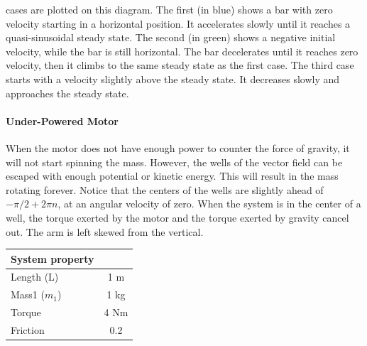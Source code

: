 \documentclass{article}
\begin{document}
 cases are plotted on this diagram. The first (in blue) shows a bar with zero velocity starting in a horizontal position. It accelerates slowly until it reaches a quasi-sinusoidal steady state. The second (in green) shows a negative initial velocity, while the bar is still horizontal. The bar decelerates until it reaches zero velocity, then it climbs to the same steady state as the first case. The third case starts with a velocity slightly above the steady state. It decreases slowly and approaches the steady state.

\begin{center}
%
\label{labelname}%
\end{center}

%
\newpage
\paragraph{Under-Powered Motor} 
When the motor does not have enough power to counter the force of gravity, it will not start spinning the mass. However, the wells of the vector field can be escaped with enough potential or kinetic energy. This will result in the mass rotating forever. Notice that the centers of the wells are slightly ahead of  $-\pi/2 + 2\pi n$, at an angular velocity of zero. When the system is in the center of a well, the torque exerted by the motor and the torque exerted by gravity cancel out. The arm is left skewed from the vertical.
\vspace{14pt}

\centering
\begin{tabular}{|l|c|}
\hline
System property & \\
\hline
Length (L) & 1 m \\
Mass1 ($m_1$) & 1 kg \\
Torque & 4 Nm \\
Friction & 0.2 \\
\hline
\end{tabular}
\label{tab:quantities}
\end{document}
